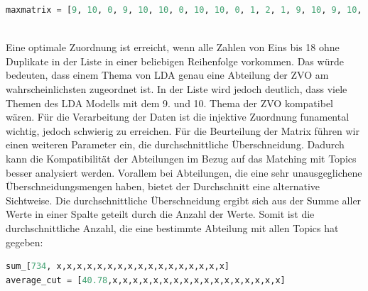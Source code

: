 \documentclass[german,version-2020-11]{uzl-thesis}
\begin{document}
\begin{enumerate}
\begin{lstlisting}[language=Python]
maxmatrix = [9, 10, 0, 9, 10, 10, 0, 10, 10, 0, 1, 2, 1, 9, 10, 9, 10, 9] TODO UPDATEN
\end{lstlisting}\\

Eine optimale Zuordnung ist erreicht, wenn alle Zahlen von Eins bis 18 ohne Duplikate in der Liste in einer beliebigen Reihenfolge vorkommen. Das würde bedeuten, dass einem Thema von LDA genau eine Abteilung der ZVO am wahrscheinlichsten zugeordnet ist. In der Liste wird jedoch deutlich, dass viele Themen des LDA Modells mit dem 9. und 10. Thema der ZVO kompatibel wären. Für die Verarbeitung der Daten ist die injektive Zuordnung funamental wichtig, jedoch schwierig zu erreichen. Für die Beurteilung der Matrix führen wir einen weiteren Parameter ein, die durchschnittliche Überschneidung. Dadurch kann die Kompatibilität der Abteilungen im Bezug auf das Matching mit Topics besser analysiert werden. Vorallem bei Abteilungen, die eine sehr unausgeglichene Überschneidungsmengen haben, bietet der Durchschnitt eine alternative Sichtweise. Die durchschnittliche Überschneidung ergibt sich aus der Summe aller Werte in einer Spalte geteilt durch die Anzahl der Werte. Somit ist die durchschnittliche Anzahl, die eine bestimmte Abteilung mit allen Topics hat gegeben: \\

\begin{lstlisting}[language=Python]
sum_[734, x,x,x,x,x,x,x,x,x,x,x,x,x,x,x,x,x]
average_cut = [40.78,x,x,x,x,x,x,x,x,x,x,x,x,x,x,x,x,x]
\end{lstlisting}\\

\end{enumerate}

\end{document}
